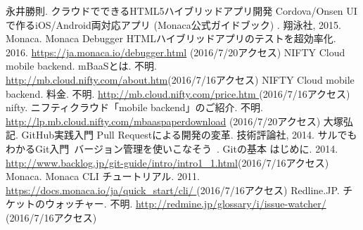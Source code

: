 \documentclass[openany,11pt,papersize]{jsbook}
\begin{document}
%
\maketitle

\frontmatter



\tableofcontents%


\mainmatter%



%









%





\begin{appendix}





\end{appendix}



\begin{thebibliography}{9}
 永井勝則. クラウドでできるHTML5ハイブリッドアプリ開発 Cordova/Onsen UIで作るiOS/Android両対応アプリ (Monaca公式ガイドブック) . 翔泳社, 2015.
 Monaca. Monaca Debugger HTMLハイブリッドアプリのテストを超効率化. 2016. \url{https://ja.monaca.io/debugger.html} (2016/7/20アクセス)
 NIFTY Cloud mobile backend. mBaaSとは. 不明. \url{http://mb.cloud.nifty.com/about.htm}(2016/7/16アクセス)
 NIFTY Cloud mobile backend. 料金. 不明. \url{http://mb.cloud.nifty.com/price.htm }(2016/7/16アクセス)
 nifty. ニフティクラウド「mobile backend」のご紹介. 不明. \url{http://lp.mb.cloud.nifty.com/mbaaspaperdownload} (2016/7/20アクセス)
 大塚弘記. GitHub実践入門 Pull Requestによる開発の変革. 技術評論社, 2014.
 サルでもわかるGit入門~バージョン管理を使いこなそう~. Gitの基本 はじめに. 2014. \url{http://www.backlog.jp/git-guide/intro/intro1_1.html}(2016/7/16アクセス)
 Monaca. Monaca CLI チュートリアル. 2011. \url{https://docs.monaca.io/ja/quick_start/cli/ }(2016/7/16アクセス)
 Redline.JP. チケットのウォッチャー. 不明. \url{http://redmine.jp/glossary/i/issue-watcher/ }(2016/7/16アクセス)
\end{thebibliography}
\end{document}
